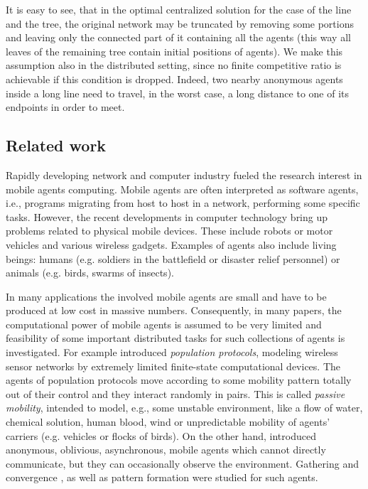 \documentclass{article}
\begin{document}
It is easy to see, that in the optimal centralized solution for the case of the line and the tree, the original network may be truncated by removing some portions and leaving only the connected part of it containing all the agents (this way all leaves of the remaining tree contain initial positions of agents). We make this assumption also in the distributed setting, since no finite competitive ratio is achievable if this condition is dropped. Indeed, two nearby anonymous agents inside a long line need to travel, in the worst case, a long distance to one of its endpoints in order to meet.

\subsection{Related work}\label{s:related}

Rapidly developing network and computer industry fueled the research interest in mobile agents computing. Mobile agents are often interpreted as 
software agents, i.e., programs migrating from host to host in a network, performing some specific tasks. However, the recent developments in computer technology bring up problems related to physical mobile devices. These include robots or motor vehicles and various wireless gadgets.
Examples of agents also include living beings: humans (e.g. soldiers in the battlefield or disaster relief personnel) or animals (e.g. birds, swarms of insects). 

In many applications the involved mobile agents are small and have to be produced at low cost in massive numbers. Consequently, in many papers, the computational power of mobile agents is assumed to be very limited and feasibility of some important distributed tasks for such collections of agents is investigated. For example \cite{AA06} introduced {\em population protocols}, modeling wireless sensor networks by extremely limited finite-state computational devices. The agents of population protocols move according to some mobility pattern totally out of their control and they interact randomly in pairs. This is called {\em passive mobility}, intended to model, e.g., some unstable environment, like a flow of water, chemical solution, human blood, wind or unpredictable mobility of agents' carriers (e.g. vehicles or flocks of birds). On the other hand,
\cite{SY} introduced anonymous, oblivious, asynchronous, mobile agents which cannot directly communicate, but they can occasionally observe the environment. Gathering and convergence  \cite{AOSY,CFPS,CP,C15}, as well as pattern formation \cite{DFSY,FPSW,SY,YS} were studied for such agents.
\end{document}
